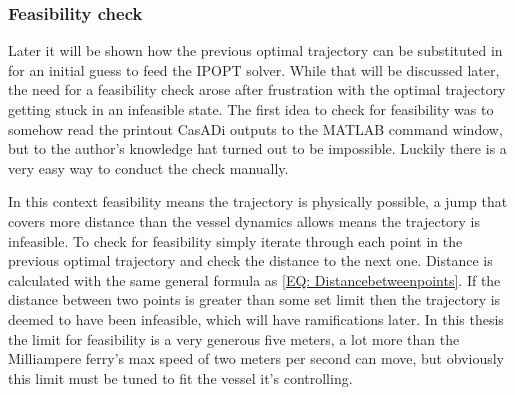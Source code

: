 \subsubsection*{Feasibility check}
Later it will be shown how the previous optimal trajectory can be substituted in for an initial guess to feed the \gls{IPOPT} solver. While
that will be discussed later, the need for a feasibility check arose after frustration with the optimal trajectory getting stuck in an
infeasible state. The first idea to check for feasibility was to somehow read the printout CasADi outputs to the MATLAB command window, 
but to the author's knowledge hat turned out to be impossible. Luckily there is a very easy way to conduct the check manually.

In this context feasibility means the trajectory is physically possible, a jump that covers more distance than the vessel
dynamics allows means the trajectory is infeasible. To check for feasibility simply iterate through each point in the previous
optimal trajectory and check the distance to the next one. Distance is calculated with the same general formula as \eqref{EQ: Distancebetweenpoints}.
If the distance between two points is greater than some set limit then the trajectory is deemed to have been infeasible, which will have
ramifications later. In this thesis the limit for feasibility is a very generous five meters, a lot more than the Milliampere ferry's max speed of
two meters per second can move, but obviously this limit must be tuned to fit the vessel it's controlling.

